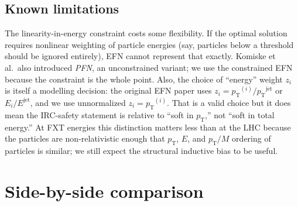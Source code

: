 \documentclass[11pt]{article}
\newcommand{\pT}{\ensuremath{p_{\text{T}}}}
\begin{document}
\subsection{Known limitations}

The linearity-in-energy constraint costs some flexibility. If the
optimal solution requires nonlinear weighting of particle energies
(say, particles below a threshold should be ignored entirely), EFN
cannot represent that exactly. Komiske et al.\ also introduced
\emph{PFN}, an unconstrained variant; we use the constrained EFN
because the constraint is the whole point. Also, the choice of
``energy'' weight $z_i$ is itself a modelling decision: the original
EFN paper uses $z_i = \pT^{(i)}/\pT^{\text{jet}}$ or
$E_i/E^{\text{jet}}$, and we use unnormalized $z_i = \pT^{(i)}$.
That is a valid choice but it does mean the IRC-safety statement is
relative to ``soft in $\pT$,'' not ``soft in total energy.'' At FXT
energies this distinction matters less than at the LHC because the
particles are non-relativistic enough that $\pT$, $E$, and $\pT/M$
ordering of particles is similar; we still expect the structural
inductive bias to be useful.

\clearpage
\section{Side-by-side comparison}
\label{sec:comparison}
\end{document}
